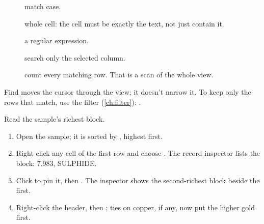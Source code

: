 \begin{description}
\item[] match case.
\item[] whole cell: the cell must be exactly the text, not just contain it.
\item[] a regular expression.
\item[] search only the selected column.
\item[\ui{\#}] count every matching row. That is a scan of the whole view.
\end{description}

Find moves the cursor through the view; it doesn't narrow it. To keep only the rows that match, use the
filter (\cref{ch:filter}): .

\begin{tryit}
Read the sample's richest block.
\begin{enumerate}
\item Open the sample; it is sorted by , highest first.
\item Right-click any cell of the first row and choose . The record inspector
lists the block:  7.983,  SULPHIDE.
\item Click  to pin it, then . The inspector shows the second-richest block beside the first.
\item Right-click the  header, then : ties on copper, if any, now
put the higher gold first.
\end{enumerate}
\end{tryit}
